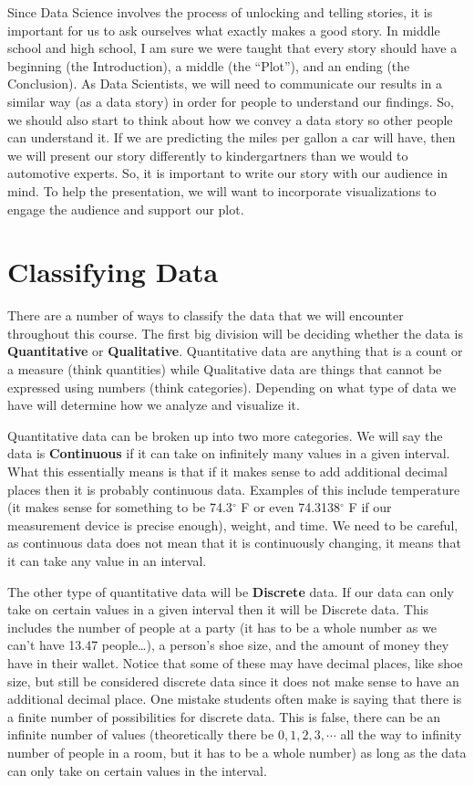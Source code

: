\documentclass[
  letterpaper,
  DIV=11,
  numbers=noendperiod]{scrreprt}
\begin{document}
Since Data Science involves the process of unlocking and telling
stories, it is important for us to ask ourselves what exactly makes a
good story. In middle school and high school, I am sure we were taught
that every story should have a beginning (the Introduction), a middle
(the ``Plot''), and an ending (the Conclusion). As Data Scientists, we
will need to communicate our results in a similar way (as a data story)
in order for people to understand our findings. So, we should also start
to think about how we convey a data story so other people can understand
it. If we are predicting the miles per gallon a car will have, then we
will present our story differently to kindergartners than we would to
automotive experts. So, it is important to write our story with our
audience in mind. To help the presentation, we will want to incorporate
visualizations to engage the audience and support our plot.

\section{Classifying Data}\label{classifying-data}

There are a number of ways to classify the data that we will encounter
throughout this course. The first big division will be deciding whether
the data is \textbf{Quantitative} or \textbf{Qualitative}. Quantitative
data are anything that is a count or a measure (think quantities) while
Qualitative data are things that cannot be expressed using numbers
(think categories). Depending on what type of data we have will
determine how we analyze and visualize it.

Quantitative data can be broken up into two more categories. We will say
the data is \textbf{Continuous} if it can take on infinitely many values
in a given interval. What this essentially means is that if it makes
sense to add additional decimal places then it is probably continuous
data. Examples of this include temperature (it makes sense for something
to be 74.3\(^\circ\) F or even 74.3138\(^\circ\) F if our measurement
device is precise enough), weight, and time. We need to be careful, as
continuous data does not mean that it is continuously changing, it means
that it can take any value in an interval.

The other type of quantitative data will be \textbf{Discrete} data. If
our data can only take on certain values in a given interval then it
will be Discrete data. This includes the number of people at a party (it
has to be a whole number as we can't have 13.47 people\ldots), a
person's shoe size, and the amount of money they have in their wallet.
Notice that some of these may have decimal places, like shoe size, but
still be considered discrete data since it does not make sense to have
an additional decimal place. One mistake students often make is saying
that there is a finite number of possibilities for discrete data. This
is false, there can be an infinite number of values (theoretically there
be \(0, 1, 2, 3, \cdots\) all the way to infinity number of people in a
room, but it has to be a whole number) as long as the data can only take
on certain values in the interval.
\end{document}
